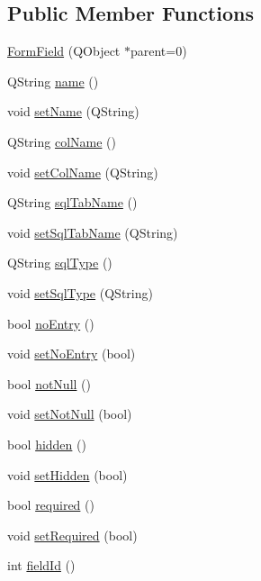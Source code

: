 \subsection*{Public Member Functions}
\begin{DoxyCompactItemize}
\item 
\hyperlink{classFormField_a7208af5aa5a791c9c86148d6cb66b9f8}{FormField} (QObject $\ast$parent=0)
\item 
QString \hyperlink{classFormField_a215caa284c220e889de7fa96bba4adf5}{name} ()
\item 
void \hyperlink{classFormField_a377c8c0b78a87bae4aa18be92f00e48a}{setName} (QString)
\item 
QString \hyperlink{classFormField_a7039517b94a2320fca6c834a412fb6b9}{colName} ()
\item 
void \hyperlink{classFormField_a359314a81978dc6dd169f84ec91de066}{setColName} (QString)
\item 
QString \hyperlink{classFormField_a28963efac4457b6d7312e9a1cb2e487c}{sqlTabName} ()
\item 
void \hyperlink{classFormField_a6d1dc5a4a95ef91a78b3bb271d581a59}{setSqlTabName} (QString)
\item 
QString \hyperlink{classFormField_a04114033387a664667d67b14defb0850}{sqlType} ()
\item 
void \hyperlink{classFormField_a7f4a7c832ff7670d69288b2a1e370e35}{setSqlType} (QString)
\item 
bool \hyperlink{classFormField_a4790898b5c806db22925ec6322191b89}{noEntry} ()
\item 
void \hyperlink{classFormField_a96b15a7a89e7d7e8fabae2cc40d6c5bb}{setNoEntry} (bool)
\item 
bool \hyperlink{classFormField_a0f409108a33cae8d0e22082f5f26f6a2}{notNull} ()
\item 
void \hyperlink{classFormField_ad36a82ba7392e37477cdc1b4ffe3e62a}{setNotNull} (bool)
\item 
bool \hyperlink{classFormField_a367a5f4ac96d07a32a0e1a6c21e89a11}{hidden} ()
\item 
void \hyperlink{classFormField_a3d20d4327791a7841305add68e458555}{setHidden} (bool)
\item 
bool \hyperlink{classFormField_aafaf8e53177986629c92bb019b4416bd}{required} ()
\item 
void \hyperlink{classFormField_a77ecd265c65bb495e52312806f15becc}{setRequired} (bool)
\item 
int \hyperlink{classFormField_a482265a6cc61b55254c32ab3bfe896ed}{fieldId} ()

\end{DoxyCompactItemize}
